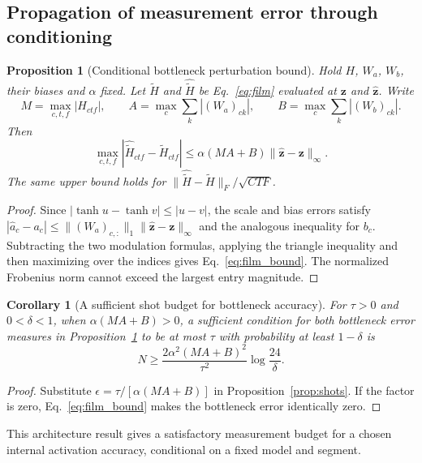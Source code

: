 \documentclass[10pt,a4paper]{article}
\newtheorem{proposition}{Proposition}
\newtheorem{corollary}{Corollary}
\newcommand{\norm}[1]{\lVert #1\rVert}
\begin{document}
\subsection{Propagation of measurement error through conditioning}
\begin{proposition}[Conditional bottleneck perturbation bound]\label{prop:film}
Hold $H$, $W_a$, $W_b$, their biases and $\alpha$ fixed. Let $\widetilde H$ and $\widehat{\widetilde H}$ be Eq.~\eqref{eq:film} evaluated at $\mathbf z$ and $\widehat{\mathbf z}$. Write
\begin{equation}
M=\max_{c,t,f}|H_{ctf}|,\qquad
A=\max_c\sum_k|(W_a)_{ck}|,\qquad
B=\max_c\sum_k|(W_b)_{ck}|.
\end{equation}
Then
\begin{equation}\label{eq:film_bound}
\max_{c,t,f}|\widehat{\widetilde H}_{ctf}-\widetilde H_{ctf}|
\leq\alpha(MA+B)\norm{\widehat{\mathbf z}-\mathbf z}_\infty.
\end{equation}
The same upper bound holds for $\norm{\widehat{\widetilde H}-\widetilde H}_F/\sqrt{CTF}$.
\end{proposition}
\begin{proof}
Since $|\tanh u-\tanh v|\leq|u-v|$, the scale and bias errors satisfy $|\widehat a_c-a_c|\leq\norm{(W_a)_{c,:}}_1\norm{\widehat{\mathbf z}-\mathbf z}_\infty$ and the analogous inequality for $b_c$. Subtracting the two modulation formulas, applying the triangle inequality and then maximizing over the indices gives Eq.~\eqref{eq:film_bound}. The normalized Frobenius norm cannot exceed the largest entry magnitude.
\end{proof}
\begin{corollary}[A sufficient shot budget for bottleneck accuracy]
For $\tau>0$ and $0<\delta<1$, when $\alpha(MA+B)>0$, a sufficient condition for both bottleneck error measures in Proposition~\ref{prop:film} to be at most $\tau$ with probability at least $1-\delta$ is
\begin{equation}\label{eq:shot_budget}
N\geq\frac{2\alpha^2(MA+B)^2}{\tau^2}\log\frac{24}{\delta}.
\end{equation}
\end{corollary}
\begin{proof}
Substitute $\epsilon=\tau/[\alpha(MA+B)]$ in Proposition~\ref{prop:shots}. If the factor is zero, Eq.~\eqref{eq:film_bound} makes the bottleneck error identically zero.
\end{proof}

This architecture result gives a satisfactory measurement budget for a chosen internal activation accuracy, conditional on a fixed model and segment. 
\end{document}
